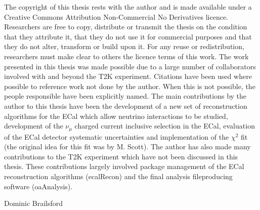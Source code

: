 \begin{declaration}
The copyright of this thesis rests with the author and is made available under a Creative Commons Attribution Non-Commercial No Derivatives licence. Researchers are free to copy, distribute or transmit the thesis on the condition that they attribute it, that they do not use it for commercial purposes and that they do not alter, transform or build upon it. For any reuse or redistribution, researchers must make clear to others the licence terms of this work.
\newline
\newline
The work presented in this thesis was made possible due to a large number of collaborators involved with and beyond the T2K experiment.  Citations have been used where possible to reference work not done by the author.  When this is not possible, the people responsible have been explicitly named.
\newline
\newline
The main contributions by the author to this thesis have been the development of a new set of reconstruction algorithms for the ECal which allow neutrino interactions to be studied, development of the $\nu_\mu$ charged current inclusive selection in the ECal, evaluation of the ECal detector systematic uncertainties and implementation of the $\chi^2$ fit (the original idea for this fit was by M. Scott).
\newline
\newline
The author has also made many contributions to the T2K experiment which have not been discussed in this thesis.  These contributions largely involved package management of the ECal reconstruction algorithms (ecalRecon) and the final analysis fileproducing software (oaAnalysis).
  \vspace*{1cm}
  \begin{flushright}
    Dominic Brailsford
  \end{flushright}
\end{declaration}


